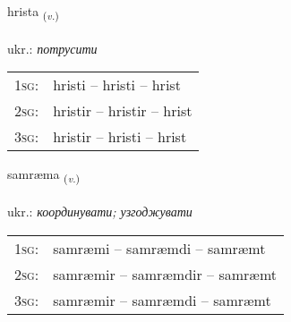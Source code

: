 \documentclass[frontgrid, backgrid]{flacards}\usepackage[]{graphicx}\usepackage[]{xcolor}
\begin{document}
\renewcommand{\flhead}{\vskip5pt \fboxsep=0pt {\small\bfseries\footnotesize Sagnorð | дієслово}}
\renewcommand{\fcfoot}{\vskip5pt \fboxsep=0pt \hspace{2pt}{\small\bfseries\footnotesize 2K}}

\renewcommand{\blhead}{\vskip5pt {\small\bfseries\footnotesize Sagnorð | дієслово }}
\renewcommand{\bcfoot}{\vskip5pt \hspace{2pt}{\small\bfseries\footnotesize 2K}}


{hrista \small{\textsubscript{(\textit{v.})}} \\[1ex] %
\textphonetic{[r̥ɪsta]} \\
ukr.: \emph{потрусити} \\  [2ex]
\renewcommand*{\arraystretch}{0.8}
\begin{tabular}{p{1cm}l}
\textsc{1sg}: & hristi -- hristi -- hrist \\ 
\textsc{2sg}: & hristir -- hristir -- hrist \\ 
\textsc{3sg}: & hristir -- hristi -- hrist \\ 
\end{tabular}
}

\renewcommand{\flhead}{\vskip5pt \fboxsep=0pt {\small\bfseries\footnotesize Sagnorð | дієслово}}
\renewcommand{\fcfoot}{\vskip5pt \fboxsep=0pt \hspace{2pt}{\small\bfseries\footnotesize 2K}}

\renewcommand{\blhead}{\vskip5pt {\small\bfseries\footnotesize Sagnorð | дієслово }}
\renewcommand{\bcfoot}{\vskip5pt \hspace{2pt}{\small\bfseries\footnotesize 2K}}


{samræma \small{\textsubscript{(\textit{v.})}} \\[1ex] %
\textphonetic{[samraima]} \\
ukr.: \emph{координувати; узгоджувати} \\  [2ex]
\renewcommand*{\arraystretch}{0.8}
\begin{tabular}{p{1cm}l}
\textsc{1sg}: & samræmi -- samræmdi -- samræmt \\ 
\textsc{2sg}: & samræmir -- samræmdir -- samræmt \\ 
\textsc{3sg}: & samræmir -- samræmdi -- samræmt \\ 
\end{tabular}
}
\end{document}

